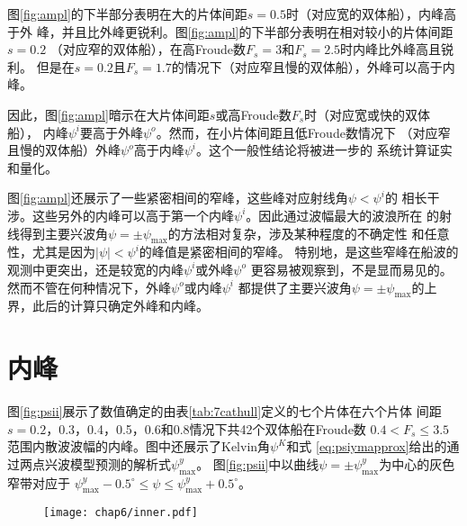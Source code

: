 图\ref{fig:ampl}的下半部分表明在大的片体间距$s=0.5$时（对应宽的双体船），内峰高于外
峰，并且比外峰更锐利。图\ref{fig:ampl}的下半部分表明在相对较小的片体间距$s=0.2$
（对应窄的双体船），在高Froude数$F_s=3$和$F_s=2.5$时内峰比外峰高且锐利。
但是在$s=0.2$且$F_s=1.7$的情况下（对应窄且慢的双体船），外峰可以高于内峰。

因此，图\ref{fig:ampl}暗示在大片体间距$s$或高Froude数$F_s$时（对应宽或快的双体船），
内峰$\psi^i$要高于外峰$\psi^o$。然而，在小片体间距且低Froude数情况下
（对应窄且慢的双体船）外峰$\psi^o$高于内峰$\psi^i$。这个一般性结论将被进一步的
系统计算证实和量化。

图\ref{fig:ampl}还展示了一些紧密相间的窄峰，这些峰对应射线角$\psi<\psi^i$的
相长干涉。这些另外的内峰可以高于第一个内峰$\psi^i$。因此通过波幅最大的波浪所在
的射线得到主要兴波角$\psi=\pm\psi_{\max}$的方法相对复杂，涉及某种程度的不确定性
和任意性，尤其是因为$|\psi|<\psi^i$的峰值是紧密相间的窄峰。
特别地，是这些窄峰在船波的观测中更突出，还是较宽的内峰$\psi^i$或外峰$\psi^o$
更容易被观察到，不是显而易见的。然而不管在何种情况下，外峰$\psi^o$或内峰$\psi^i$
都提供了主要兴波角$\psi=\pm\psi_{\max}$的上界，此后的计算只确定外峰和内峰。



\section{内峰}
\label{sec:inner}
图\ref{fig:psii}展示了数值确定的由表\ref{tab:7cathull}定义的七个片体在六个片体
间距$s=0.2$，0.3，0.4，0.5，0.6和0.8情况下共42个双体船在Froude数
$0.4<F_s\le3.5$范围内散波波幅的内峰。图中还展示了Kelvin角$\psi^K$和式
\eqref{eq:psiymapprox}给出的通过两点兴波模型预测的解析式$\psi^y_{\max}$。
图\ref{fig:psii}中以曲线$\psi=\pm\psi^y_{\max}$为中心的灰色窄带对应于
$\psi^y_{\max}-0.5^\circ\le\psi\le\psi^y_{\max}+0.5^\circ$。
%
\begin{figure}[htp]
  \centering
  \captionstyle{\centering}
    \texttt{[image: chap6/inner.pdf]}
\end{figure}

